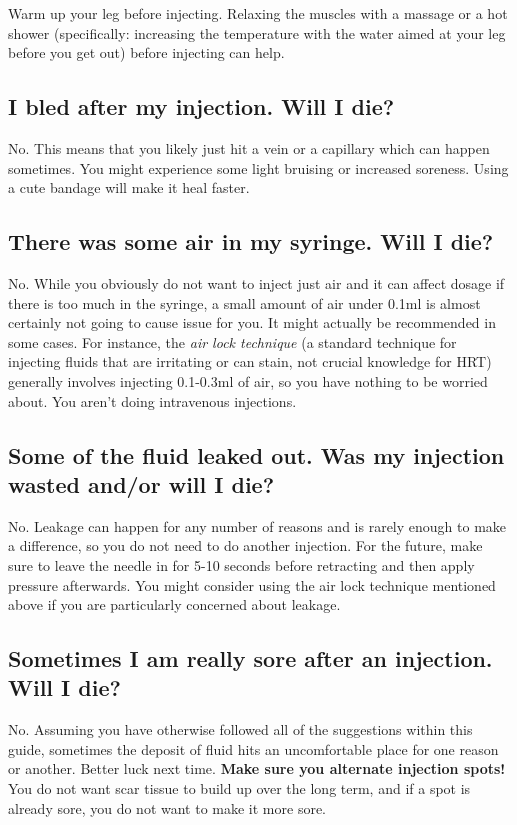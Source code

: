 \documentclass{article}
\begin{document}
{{Warm up your leg before injecting. Relaxing the muscles with a massage or a hot shower (specifically: increasing the temperature with the water aimed at your leg before you get out) before injecting can help.

\subsection{I bled after my injection. Will I die?}

No. This means that you likely just hit a vein or a capillary which can happen sometimes. You might experience some light bruising or increased soreness. Using a cute bandage will make it heal faster.

\subsection{There was some air in my syringe. Will I die?}\label{7-7}

No. While you obviously do not want to inject just air and it can affect dosage if there is too much in the syringe, a small amount of air under 0.1ml is almost certainly not going to cause issue for you. It might actually be recommended in some cases. For instance, the \textit{air lock technique} (a standard technique for injecting fluids that are irritating or can stain, not crucial knowledge for HRT) generally involves injecting 0.1-0.3ml of air, so you have nothing to be worried about. You aren’t doing intravenous injections.

\subsection{Some of the fluid leaked out. Was my injection wasted and/or will I die?}

No. Leakage can happen for any number of reasons and is rarely enough to make a difference, so you do not need to do another injection. For the future, make sure to leave the needle in for 5-10 seconds before retracting and then apply pressure afterwards. You might consider using the air lock technique mentioned above if you are particularly concerned about leakage.

\subsection{Sometimes I am really sore after an injection. Will I die?}

No. Assuming you have otherwise followed all of the suggestions within this guide, sometimes the deposit of fluid hits an uncomfortable place for one reason or another. Better luck next time. \textbf{Make sure you alternate injection spots!} You do not want scar tissue to build up over the long term, and if a spot is already sore, you do not want to make it more sore.

}}
\end{document}
